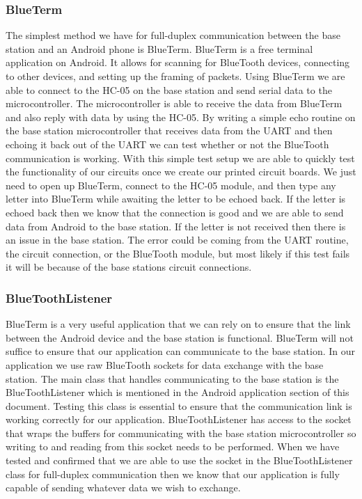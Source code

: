 \subsubsection{BlueTerm}
The simplest method we have for full{}-duplex communication between the base
station and an Android phone is BlueTerm.  BlueTerm is a free terminal
application on Android. It allows for scanning for BlueTooth devices,
connecting to other devices, and setting up the framing of packets. Using
BlueTerm we are able to connect to the HC{}-05 on the base station and send
serial data to the microcontroller. The microcontroller is able to receive
the data from BlueTerm and also reply with data by using the HC{}-05. By
writing a simple echo routine on the base station microcontroller that receives
data from the UART and then echoing it back out of the UART we can test whether
or not the BlueTooth communication is working. With this simple test setup we
are able to quickly test the functionality of our circuits once we create
our printed circuit boards. We just need to open up BlueTerm, connect to the
HC{}-05 module, and then type any letter into BlueTerm while awaiting the
letter to be echoed back. If the letter is echoed back then we know that the
connection is good and we are able to send data from Android to the base
station. If the letter is not received then there is an issue in the base
station. The error could be coming from the UART routine, the circuit
connection, or the BlueTooth module, but most likely if this test fails it will
be because of the base stations circuit connections.

\subsubsection{BlueToothListener}
BlueTerm is a very useful application that we can rely on to ensure that
the link between the Android device and the base station is functional.
BlueTerm will not suffice to ensure that our application can communicate to the
base station. In our application we use raw BlueTooth sockets for
data exchange with the base station. The main class that handles
communicating to the base station is the BlueToothListener which is mentioned
in the Android application section of this document. Testing this class is
essential to ensure that the communication link is working correctly for our
application. BlueToothListener has access to the socket that wraps the
buffers for communicating with the base station microcontroller so writing to
and reading from this socket needs to be performed. When we have tested and
confirmed that we are able to use the socket in the BlueToothListener class for
full{}-duplex communication then we know that our application is fully capable
of sending whatever data we wish to exchange.

